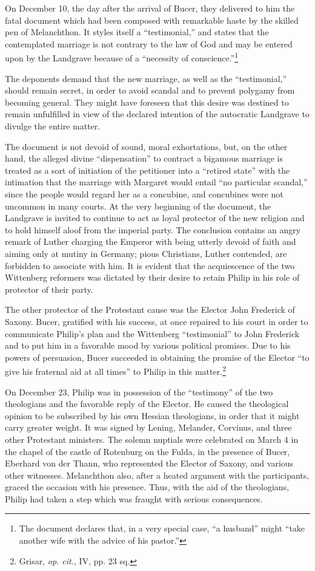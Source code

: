 On December 10, the day after the arrival of Bucer, they delivered
to him the fatal document which had been composed with remarkable haste
by the skilled pen of Melanchthon. It styles itself a “testimonial,” and
states that the contemplated marriage is not contrary to
the law of God and may be entered upon by the Landgrave because of
a “necessity of conscience.”\footnote
{The document declares that, in a very special case, “a husband” might ``take another
wife with the advice of his pastor.''}

The deponents demand that the new
marriage, as well as the “testimonial,” should remain secret, in order
to avoid scandal and to prevent polygamy from becoming general.
They might have foreseen that this desire was destined to remain unfulfilled
in view of the declared intention of the autocratic Landgrave
to divulge the entire matter.

The document is not devoid of sound, moral exhortations, but, on the
other hand, the alleged divine “dispensation” to contract a bigamous marriage
is treated as a sort of initiation of the petitioner into a “retired state”
with the intimation that the marriage with Margaret would entail “no particular
scandal,” since the people would regard her as a concubine, and
concubines were not uncommon in many courts. At the very beginning of
the document, the Landgrave is invited to continue to act as loyal protector
of the new religion and to hold himself aloof from the imperial party. The
conclusion contains an angry remark of Luther charging the Emperor with
being utterly devoid of faith and aiming only at mutiny in Germany; pious
Christians, Luther contended, are forbidden to associate with him.
It is evident that the acquiescence of the two Wittenberg reformers was
dictated by their desire to retain Philip in his role of protector of their party.

The other protector of the Protestant cause was the Elector John
Frederick of Saxony. Bucer, gratified with his success, at once repaired
to his court in order to communicate Philip’s plan and the
Wittenberg ``testimonial'' to John Frederick and to put him in a
favorable mood by various political promises. Due to his powers of
persuasion, Bucer succeeded in obtaining the promise of the Elector
“to give his fraternal aid at all times” to Philip in this matter.\footnote{Grisar, \textit{op. cit.}, IV, pp. 23 sq.}

On December 23, Philip was in possession of the “testimony” of
the two theologians and the favorable reply of the Elector. He caused
the theological opinion to be subscribed by his own Hessian theologians,
in order that it might carry greater weight. It was signed by
Lening, Melander, Corvinus, and three other Protestant ministers. The
solemn nuptials were celebrated on March 4 in the chapel of the castle
of Rotenburg on the Fulda, in the presence of Bucer, Eberhard
von der Thann, who represented the Elector of Saxony, and various
other witnesses. Melanchthon also, after a heated argument with the
participants, graced the occasion with his presence. Thus, with the
aid of the theologians, Philip had taken a step which was fraught
with serious consequences.

